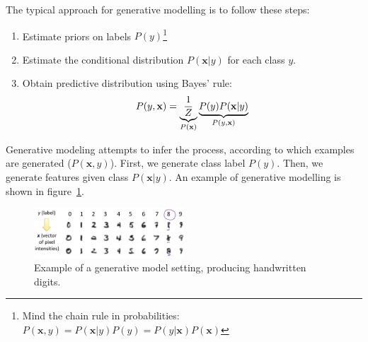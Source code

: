 \documentclass[a4paper,10pt,twoside]{article}
\begin{document}
The typical approach for generative modelling is to follow these steps:
\begin{enumerate}
\item Estimate priors on labels $P(y)$\footnote{Mind the chain rule in probabilities: $P(\mathbf{x},y)=P(\mathbf{x}|y)P(y)=P(y|\mathbf{x})P(\mathbf{x})$}
\item Estimate the conditional distribution $P(\mathbf{x}|y)$ for each class $y$.
\item Obtain predictive distribution using Bayes' rule:
  \begin{equation*}
    P(y,\mathbf{x})=\underbrace{{1\over Z}}_{P(\mathbf{x})}\underbrace{P(y)P(\mathbf{x}|y)}_{P(y,\mathbf{x})}
  \end{equation*}
\end{enumerate}

Generative modeling attempts to infer the process, according to which examples are generated ($P(\mathbf{x},y)$). First, we generate class label $P(y)$. Then, we generate features given class $P(\mathbf{x}|y)$. An example of generative modelling is shown in figure~\ref{fig:example_generative_modelling}.

\begin{figure}
  \centering
  \includegraphics[width=0.5\textwidth]{figures/example_generative_modelling.png}
  \caption{Example of a generative model setting, producing handwritten digits.}
  \label{fig:example_generative_modelling}
\end{figure}
\end{document}
